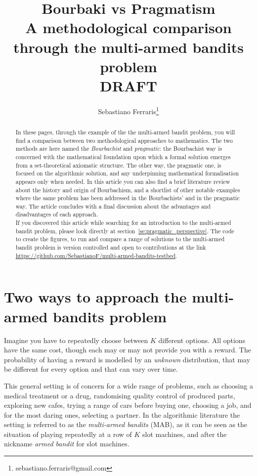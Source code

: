 \documentclass[]{scrartcl}
\title{Bourbaki vs Pragmatism \\ A methodological comparison through the multi-armed bandits problem
 \\
 DRAFT
}
\author{Sebastiano Ferraris\footnote{sebastiano.ferraris@gmail.com}}
\theoremstyle{definition}
\begin{document}
\maketitle

\begin{abstract}
    In these pages, through the example of the the multi-armed bandit problem, you will find a comparison between two methodological approaches to mathematics.
    The two methods are here named the \emph{Bourbachist} and \emph{pragmatic}: the Bourbachist way is concerned with the mathematical foundation upon which a formal solution emerges from a set-theoretical axiomatic structure. The other way, the pragmatic one, is focused on the algorithmic solution, and any underpinning mathematical formalisation appears only when needed.
    In this article you can also find a brief literature review about the history and origin of Bourbachism, and a shortlist of other notable examples where the same problem has been addressed in the Bourbachists' and in the pragmatic way. The article concludes with a final discussion about the advantages and disadvantages of each approach. \\

\noindent
If you discovered this article while searching for an introduction to the multi-armed bandit problem, please look directly at section~\ref{se:pragmatic_perspective}. The code to create the figures, to run and compare a range of solutions to the multi-armed bandit problem is version controlled and open to contributions at the link \href{https://github.com/SebastianoF/multi-armed-bandits-testbed}{https://github.com/SebastianoF/multi-armed-bandits-testbed}.
\end{abstract}


\section{Two ways to approach the multi-armed bandits problem}
\label{se:intro}
Imagine you have to repeatedly choose between $K$ different options. All options have the same cost, though each may or may not provide you with a reward. The probability of having a reward is modelled by an \emph{unknown} distribution, that may be different for every option and that can vary over time.

This general setting is of concern for a wide range of problems, such as choosing a medical treatment or a drug, randomising quality control of produced parts, exploring new cafes, trying a range of cars before buying one, choosing a job, and for the most daring ones, selecting a partner. In the algorithmic literature the setting is referred to as the \emph{multi-armed bandits} (MAB), as it can be seen as the situation of playing repeatedly at a row of $K$ slot machines, and after the nickname \emph{armed bandit} for slot machines.
\end{document}
